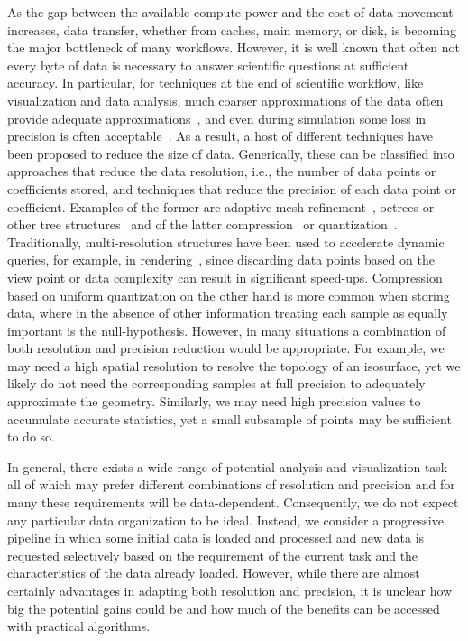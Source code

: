 As the gap between the available compute power and the cost of data
movement increases, data transfer, whether from caches, main memory,
or disk, is becoming the major bottleneck of many workflows. However,
it is well known that often not every byte of data is necessary to
answer scientific questions at sufficient accuracy.  In particular,
for techniques at the end of scientific workflow, like visualization
and data analysis, much coarser approximations of the data often
provide adequate
approximations~\cite{woodring2011,covra2012,compression_sim2013}, and
even during simulation some loss in precision is often
acceptable~\cite{compression_sim2013}. As a result, a host of
different techniques have been proposed to reduce the size of
data. Generically, these can be classified into approaches that reduce
the data resolution, i.e., the number of data points or coefficients
stored, and techniques that reduce the precision of each data point or
coefficient.  Examples of the former are adaptive mesh
refinement~\cite{amr1989}, octrees or other tree
structures~\cite{hierarchical1984} and of the latter
compression~\cite{zfp2014} or quantization~\cite{vq1992}.
Traditionally, multi-resolution structures have been used to
accelerate dynamic queries, for example, in
rendering~\cite{multires_octree1999}, since discarding data points
based on the view point or data complexity can result in significant
speed-ups. Compression based on uniform quantization on the other hand
is more common when storing data, where in the absence of other
information treating each sample as equally important is the
null-hypothesis. However, in many situations a combination of both
resolution and precision reduction would be appropriate.  For example,
we may need a high spatial resolution to resolve
the topology of an isosurface, yet we likely do not need the
corresponding samples at full precision to adequately approximate the geometry.
Similarly, we may need high precision values to accumulate accurate
statistics, yet a small subsample of points may be sufficient to do
so.    

In general, there exists a wide range of potential analysis and
visualization task all of which may prefer different combinations of
resolution and precision and for many these requirements will be
data-dependent.  Consequently, we do not expect any particular data
organization to be ideal. Instead, we consider a progressive pipeline
in which some initial data is loaded and processed and new data is
requested selectively based on the requirement of the current task and
the characteristics of the data already loaded. However, while there
are almost certainly advantages in adapting both resolution and
precision, it is unclear how big the potential gains could be and how
much of the benefits can be accessed with practical algorithms.


